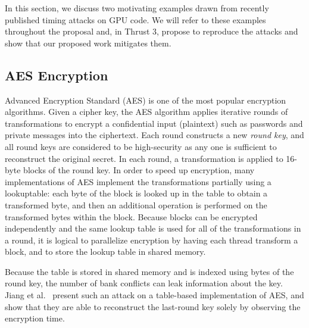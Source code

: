 \label{sec:motivating}
In this section, we discuss two motivating examples drawn from recently
published timing attacks on GPU code.
%
We will refer to these examples throughout the proposal and, in Thrust 3,
propose to reproduce the attacks and show that our proposed work mitigates
them.

\subsection{AES Encryption}
Advanced Encryption Standard (AES) is one of the most popular encryption algorithms.
%
Given a cipher key, the AES algorithm applies iterative rounds of transformations  to encrypt a confidential input (plaintext) such as passwords and private messages into the ciphertext.
%
Each round constructs a new {\em round key}, and all round keys are considered
to be high-security as any one is sufficient to reconstruct the original
secret.
%
In each round, a transformation is applied to 16-byte blocks of the round key.
%
In order to speed up encryption, many implementations of AES implement the
transformations partially using a lookuptable: each byte of the block is
looked up in the table to obtain a transformed byte, and then an additional
operation is performed on the transformed bytes within the block.
%
Because blocks can be encrypted independently and the same lookup table is used
for all of the transformations in a round, it is logical to parallelize
encryption by having each thread transform a block, and to store the lookup
table in shared memory.

Because the table is stored in shared memory and is indexed using bytes of the
round key, the number of bank conflicts can leak information about the key.
%
Jiang et al.~\cite{AESattack} present such an attack on a table-based
implementation of AES, and show that they are able to reconstruct the
last-round key solely by observing the encryption time.

